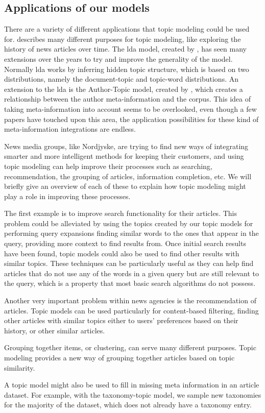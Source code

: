 \subsection{Applications of our models}\label{sec:appendix_applications}
There are a variety of different applications that topic modeling could be used for. 
\citet{Probabilistic_Topic_Models} describes many different purposes for topic modeling, like exploring the history of news articles over time.
The \gls{lda} model, created by \citet{blei2003latent}, has seen many extensions over the years to try and improve the generality of the model.
Normally \gls{lda} works by inferring hidden topic structure, which is based on two distributions, namely the document-topic and topic-word distributions.
An extension to the \gls{lda} is the Author-Topic model, created by \citet{author_topic_2012}, which creates a relationship between the author meta-information and the corpus.
This idea of taking meta-information into account seems to be overlooked, even though a few papers have touched upon this area, the application possibilities for these kind of meta-information integrations are endless.

News media groups, like Nordjyske, are trying to find new ways of integrating smarter and more intelligent methods for keeping their customers, and using topic modeling can help improve their processes such as searching, recommendation, the grouping of articles, information completion, etc.
We will briefly give an overview of each of these to explain how topic modeling might play a role in improving these processes.

The first example is to improve search functionality for their articles.
This problem could be alleviated by using the topics created by our topic models for performing query expansions finding similar words to the ones that appear in the query, providing more context to find results from.
Once initial search results have been found, topic models could also be used to find other results with similar topics.
These techniques can be particularly useful as they can help find articles that do not use any of the words in a given query but are still relevant to the query, which is a property that most basic search algorithms do not possess.

Another very important problem within news agencies is the recommendation of articles.
Topic models can be used particularly for content-based filtering, finding other articles with similar topics either to users' preferences based on their history, or other similar articles.

Grouping together items, or clustering, can serve many different purposes. 
Topic modeling provides a new way of grouping together articles based on topic similarity.

A topic model might also be used to fill in missing meta information in an article dataset.
For example, with the taxonomy-topic model, we sample new taxonomies for the majority of the dataset, which does not already have a taxonomy entry.
